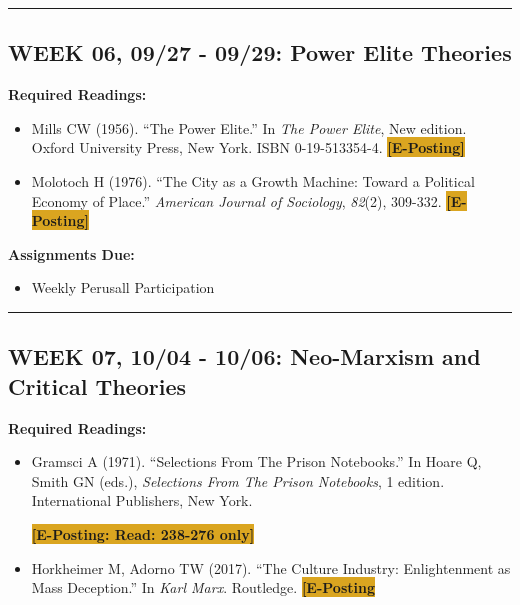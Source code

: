 \documentclass[11pt,]{article}
\providecommand{\tightlist}{%
  \setlength{\itemsep}{0pt}\setlength{\parskip}{0pt}}
\begin{document}
\bigbreak
\hrule

\hypertarget{week-06-0927---0929-power-elite-theories}{%
\subsection{WEEK 06, 09/27 - 09/29: Power Elite
Theories}\label{week-06-0927---0929-power-elite-theories}}

\textbf{Required Readings:}

\begin{itemize}
\item
  Mills CW (1956). ``The Power Elite.'' In \emph{The Power Elite}, New
  edition. Oxford University Press, New York. ISBN 0-19-513354-4.
  \colorbox{Goldenrod}{\bf{[E-Posting]}}
\item
  Molotoch H (1976). ``The City as a Growth Machine: Toward a Political
  Economy of Place.'' \emph{American Journal of Sociology},
  \emph{82}(2), 309-332. \colorbox{Goldenrod}{\bf{[E-Posting]}}
\end{itemize}

\textbf{Assignments Due:}

\begin{itemize}
\tightlist
\item
  Weekly Perusall Participation
\end{itemize}

\bigbreak
\hrule

\hypertarget{week-07-1004---1006-neo-marxism-and-critical-theories}{%
\subsection{WEEK 07, 10/04 - 10/06: Neo-Marxism and Critical
Theories}\label{week-07-1004---1006-neo-marxism-and-critical-theories}}

\textbf{Required Readings:}

\begin{itemize}
\item
  Gramsci A (1971). ``Selections From The Prison Notebooks.'' In Hoare
  Q, Smith GN (eds.), \emph{Selections From The Prison Notebooks}, 1
  edition. International Publishers, New York.

  \colorbox{Goldenrod}{\bf{[E-Posting: Read: 238-276 only]}}
\item
  Horkheimer M, Adorno TW (2017). ``The Culture Industry: Enlightenment
  as Mass Deception.'' In \emph{Karl Marx}. Routledge.
  \colorbox{Goldenrod}{\bf{[E-Posting}}
\end{itemize}
\end{document}
